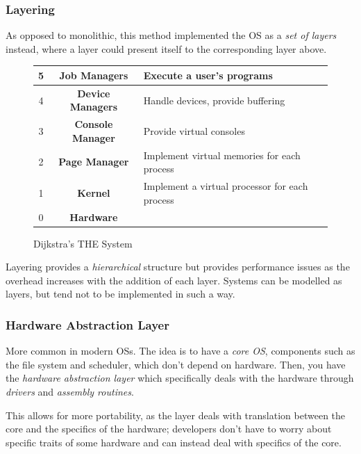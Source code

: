 \documentclass[a4]{article}
\begin{document}
\subsubsection{Layering}

As opposed to monolithic, this method implemented the OS as a \textit{set of layers} instead, where a layer could present itself to the corresponding layer above.

\begin{figure}[H]
  \centering
  \begin{center}
    \begin{tabular}{|c|c|l|}
      \hline
      5 & \textbf{Job Managers} & Execute a user's programs\\
      \hline
      4 & \textbf{Device Managers} & Handle devices, provide buffering\\
      \hline
      3 & \textbf{Console Manager} & Provide virtual consoles\\
      \hline
      2 & \textbf{Page Manager} & Implement virtual memories for each process\\
      \hline
      1 & \textbf{Kernel} & Implement a virtual processor for each process\\
      \hline
      0 & \textbf{Hardware} & \\
      \hline
    \end{tabular}
  \end{center}
  \caption{Dijkstra's THE System}
\end{figure}

Layering provides a \textit{hierarchical} structure but provides performance issues as the overhead increases with the addition of each layer. Systems can be modelled as layers, but tend not to be implemented in such a way.

\subsubsection{Hardware Abstraction Layer}

More common in modern OSs. The idea is to have a \textit{core OS}, components such as the file system and scheduler, which don't depend on hardware. Then, you have the \textit{hardware abstraction layer} which specifically deals with the hardware through \textit{drivers} and \textit{assembly routines}.

This allows for more portability, as the layer deals with translation between the core and the specifics of the hardware; developers don't have to worry about specific traits of some hardware and can instead deal with specifics of the core.
\end{document}
